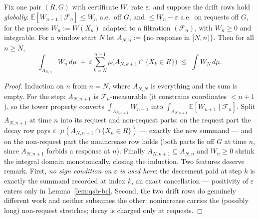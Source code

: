 \begin{blemma}\label{lem:qsb-window}
Fix one pair $(R, G)$ with certificate $W$, rate $\varepsilon$, and suppose
the drift rows hold \emph{globally}: $\mathbb{E}[W_{n+1} \mid \mathcal{F}_n]
\le W_n$ a.e.\ off $G$, and $\le W_n - \varepsilon$ a.e.\ on requests off
$G$, for the process $W_n := W(X_n)$ adapted to a filtration
$(\mathcal{F}_n)$, with $W_n \ge 0$ and integrable. For a window start $N$
let $A_{N,n} := \{\text{no response in } [N, n)\}$. Then for all $n \ge N$,
\[
\int_{A_{N,n}} W_n \, d\mu \;+\; \varepsilon \sum_{k = N}^{n-1}
\mu\bigl(A_{N,k+1} \cap \{X_k \in R\}\bigr) \;\le\; \int W_N \, d\mu .
\]
\end{blemma}
\begin{proof}
Induction on $n$ from $n = N$, where $A_{N,N}$ is everything and the sum is
empty. For the step: $A_{N,n+1}$ is $\mathcal{F}_n$-measurable (it
constrains coordinates $< n + 1$), so the tower property converts
$\int_{A_{N,n+1}} W_{n+1}$ into $\int_{A_{N,n+1}}
\mathbb{E}[W_{n+1} \mid \mathcal{F}_n]$. Split $A_{N,n+1}$ at time $n$ into
its request and non-request parts: on the request part the decay row pays
$\varepsilon \cdot \mu(A_{N,n+1} \cap \{X_n \in R\})$ --- exactly the new
summand --- and on the non-request part the nonincrease row holds (both
parts lie off $G$ at time $n$, since $A_{N,n+1}$ forbids a response at
$n$). Finally $A_{N,n+1} \subseteq A_{N,n}$ and $W_n \ge 0$ shrink the
integral domain monotonically, closing the induction. Two features deserve
remark. First, \emph{no sign condition on $\varepsilon$ is used here}: the
decrement paid at step $k$ is exactly the summand recorded at index $k$,
an exact cancellation --- positivity of $\varepsilon$ enters only in
Lemma~\ref{lem:qsb-bc}. Second, the two drift rows do genuinely different
work and neither subsumes the other: nonincrease carries the (possibly
long) non-request stretches; decay is charged only at requests.
\end{proof}

